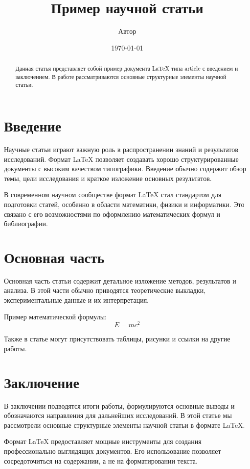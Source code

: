 \documentclass{article}
\title{Пример научной статьи}
\author{Автор}
\date{\today}
\begin{document}
\maketitle

\begin{abstract}
Данная статья представляет собой пример документа \LaTeX{} типа article с введением и заключением. В работе рассматриваются основные структурные элементы научной статьи.
\end{abstract}

\section{Введение}
Научные статьи играют важную роль в распространении знаний и результатов исследований. Формат \LaTeX{} позволяет создавать хорошо структурированные документы с высоким качеством типографики. Введение обычно содержит обзор темы, цели исследования и краткое изложение основных результатов.

В современном научном сообществе формат \LaTeX{} стал стандартом для подготовки статей, особенно в области математики, физики и информатики. Это связано с его возможностями по оформлению математических формул и библиографии.

\section{Основная часть}
Основная часть статьи содержит детальное изложение методов, результатов и анализа. В этой части обычно приводятся теоретические выкладки, экспериментальные данные и их интерпретация.

Пример математической формулы:
\begin{equation}
    E = mc^2
\end{equation}

Также в статье могут присутствовать таблицы, рисунки и ссылки на другие работы.

\section{Заключение}
В заключении подводятся итоги работы, формулируются основные выводы и обозначаются направления для дальнейших исследований. В этой статье мы рассмотрели основные структурные элементы научной статьи в формате \LaTeX{}.

Формат \LaTeX{} предоставляет мощные инструменты для создания профессионально выглядящих документов. Его использование позволяет сосредоточиться на содержании, а не на форматировании текста.
\end{document}
